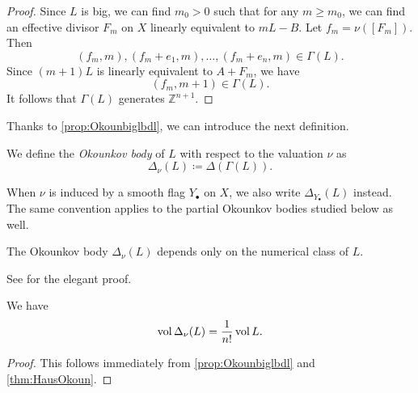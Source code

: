 \begin{proof}
Since $L$ is big, we can find $m_0>0$ such that for any $m\geq m_0$, we can find an effective divisor $F_m$ on $X$ linearly equivalent to $mL-B$. Let $f_m=\nu([F_m])$. Then
\[
(f_m,m),(f_m+e_1,m),\dots,(f_m+e_n,m)\in \Gamma(L).
\]
Since $(m+1)L$ is linearly equivalent to $A+F_m$, we have
\[
(f_m,m+1)\in \Gamma(L).
\]
It follows that $\Gamma(L)$ generates $\mathbb{Z}^{n+1}$.
\end{proof}

Thanks to \cref{prop:Okounbiglbdl}, we can introduce the next definition.
\begin{definition}\label{def:Okobd}
    We define the \emph{Okounkov body} of $L$ with respect to the valuation $\nu$ as
    \[
    \Delta_{\nu}(L)\coloneqq \Delta(\Gamma(L)).
    \]
\end{definition}
When $\nu$ is induced by a smooth flag $Y_{\bullet}$ on $X$, we also write $\Delta_{Y_{\bullet}}(L)$ instead. The same convention applies to the partial Okounkov bodies studied below as well.

\begin{proposition}\label{prop:Okounonlydepnum}
    The Okounkov body $\Delta_{\nu}(L)$ depends only on the numerical class of $L$.
\end{proposition}
See \cite[Proposition~4.1]{LM09} for the elegant proof.

\begin{corollary}\label{cor:Okounvol}
    We have
    \begin{equation}
        \operatorname{vol} \Delta_{\nu}(L)=\frac{1}{n!}\operatorname{vol} L.
    \end{equation}
\end{corollary}
\begin{proof}
    This follows immediately from \cref{prop:Okounbiglbdl} and \cref{thm:HausOkoun}.
\end{proof}

